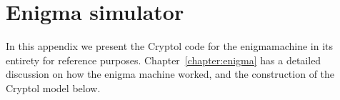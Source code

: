 \chapter{Enigma simulator}\label{app:enigma}
In this appendix we present the Cryptol code for the enigma\indEnigma machine in its entirety for
reference purposes. Chapter~\ref{chapter:enigma} has a detailed discussion on how the enigma machine worked, and the
construction of the Cryptol model below.


